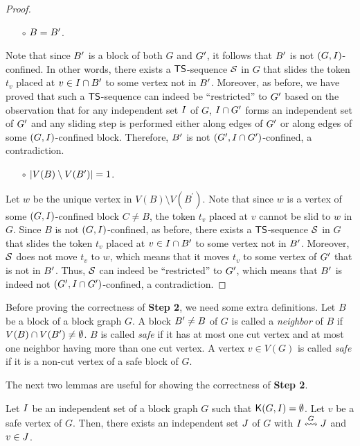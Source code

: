 \documentclass[a4paper]{llncs}
\begin{document}
\begin{proof}
\begin{itemize}
\item [$\circ$] $B = B^{\prime}$.
\end{itemize}

\noindent
Note that since $B^{\prime}$ is a block of both $G$ and ${G^\prime}$, 
	it follows that $B^{\prime}$ is not $(G, I)$-confined.
In other words, there exists a ${\sf TS}$-sequence ${\cal S}$ in $G$ that slides the token $t_v$ placed at $v \in I \cap B^{\prime}$ to some vertex not in $B^{\prime}$.
Moreover, as before, we have proved that such a ${\sf TS}$-sequence can indeed be ``restricted'' to ${G^\prime}$ based on the observation that 
	for any independent set $I$ of $G$, $I \cap {G^\prime}$ forms an independent set of ${G^\prime}$ 
	and any sliding step is performed either along edges of ${G^\prime}$ or along edges of some $(G, I)$-confined block.
Therefore, $B^{\prime}$ is not $({G^\prime}, I \cap {G^\prime})$-confined, a contradiction.
\begin{itemize}
\item [$\circ$] ${\left|V(B) \setminus V(B^\prime)\right|} = 1$.
\end{itemize}

\noindent
Let $w$ be the unique vertex in $V(B) \setminus V(B^\prime)$. 
Note that since $w$ is a vertex of some $(G, I)$-confined block $C \neq B$, the token $t_v$ placed at $v$ cannot be slid to $w$ in $G$.
Since $B$ is not $(G, I)$-confined, as before, there exists a ${\sf TS}$-sequence ${\cal S}$ in $G$ that slides the token $t_v$ placed at $v \in I \cap B^{\prime}$ to some vertex not in $B^{\prime}$.
Moreover, ${\cal S}$ does not move $t_v$ to $w$, which means that it moves $t_v$ to some vertex of ${G^\prime}$ that is not in $B^{\prime}$.
Thus, ${\cal S}$ can indeed be ``restricted'' to ${G^\prime}$, which means that $B^{\prime}$ is indeed not $({G^\prime}, I \cap {G^\prime})$-confined, a contradiction.

\end{proof}


Before proving the correctness of \textbf{Step 2}, we need some extra definitions.
Let $B$ be a block of a block graph $G$.
A block $B^{\prime} \neq B$ of $G$ is called a \emph{neighbor} of $B$ if $V(B) \cap V(B^{\prime}) \neq \emptyset$.
$B$ is called \emph{safe} if it has at most one cut vertex and at most one neighbor having more than one cut vertex.
A vertex $v \in V(G)$ is called \emph{safe} if it is a non-cut vertex of a safe block of $G$.

The next two lemmas are useful for showing the correctness of \textbf{Step 2}.


\begin{lemma}
\label{lem:slide-tokens-to-safe-vertex}
Let $I$ be an independent set of a block graph $G$ such that ${\mathsf K}{(G, I)} = \emptyset$.
Let $v$ be a safe vertex of $G$.
Then, there exists an independent set $J$ of $G$ with $I \overset{G}{\leftrightsquigarrow} J$ and $v \in J$.
\end{lemma}
\end{document}
